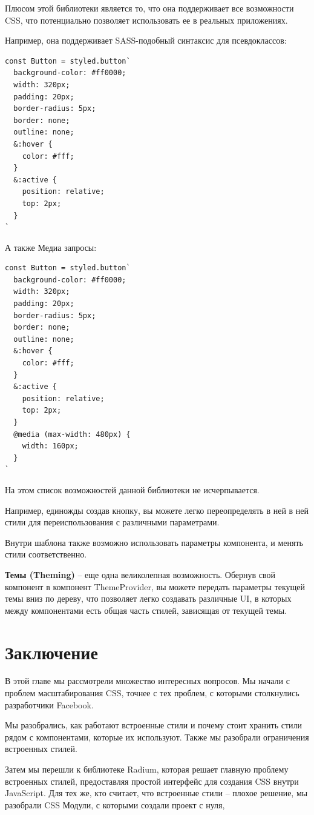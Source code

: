 Плюсом этой библиотеки является то, что она поддерживает все возможности CSS, что потенциально позволяет использовать ее в реальных приложениях.

Например, она поддерживает SASS-подобный синтаксис для псевдоклассов:

\begin{lstlisting}
const Button = styled.button`
  background-color: #ff0000;
  width: 320px;
  padding: 20px;
  border-radius: 5px;
  border: none;
  outline: none;
  &:hover {
    color: #fff;
  }
  &:active {
    position: relative;
    top: 2px;
  }
`
\end{lstlisting}

А также Медиа запросы:

\begin{lstlisting}
const Button = styled.button`
  background-color: #ff0000;
  width: 320px;
  padding: 20px;
  border-radius: 5px;
  border: none;
  outline: none;
  &:hover {
    color: #fff;
  }
  &:active {
    position: relative;
    top: 2px;
  }
  @media (max-width: 480px) {
    width: 160px;
  }
`
\end{lstlisting}

На этом список возможностей данной библиотеки не исчерпывается.

Например, единожды создав кнопку, вы можете легко переопределять в ней в ней стили для переиспользования с различными параметрами.

Внутри шаблона также возможно использовать параметры компонента, и менять стили соответственно.

\textbf{Темы (Theming)} -- еще одна великолепная возможность. Обернув свой компонент в компонент ThemeProvider, вы можете передать параметры текущей темы вниз по дереву, что позволяет легко создавать различные UI, в которых между компонентами есть общая часть стилей, зависящая от текущей темы.

\section{Заключение}

В этой главе мы рассмотрели множество интересных вопросов. Мы начали с проблем масштабирования CSS, точнее с тех проблем, с которыми столкнулись разработчики Facebook.

Мы разобрались, как работают встроенные стили и почему стоит хранить стили рядом с компонентами, которые их используют. Также мы разобрали ограничения встроенных стилей.

Затем мы перешли к библиотеке Radium, которая решает главную проблему встроенных стилей, предоставляя простой интерфейс для создания CSS внутри JavaScript. Для тех же, кто считает, что встроенные стили -- плохое решение, мы разобрали CSS Модули, с которыми создали проект с нуля,


